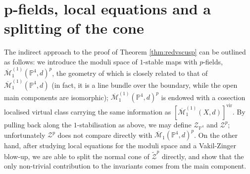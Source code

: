 \documentclass[11pt]{amsart}
\newcommand{\pazocal}{\mathcal}
\newcommand{\oM}{\overline{\mathcal{M}}}
\newcommand{\tZp}{\widetilde{\pazocal Z}^p}
\newcommand{\PP}{\mathbb P}
\newcommand{\virt}[1]{[#1]^{\mathrm{vir}}}
\theoremstyle{definition}
\theoremstyle{definition}
\begin{document}
\section{p-fields, local equations and a splitting of the cone}

The indirect approach to the proof of Theorem \ref{thm:redvscusp} can be outlined as follows: we introduce the moduli space of $1$-stable maps with $p$-fields, $\oM_1^{(1)}(\PP^4,d)^p$, the geometry of which is closely related to that of $\oM_1^{(1)}(\PP^4,d)$ (in fact, it is a line bundle over the boundary, while the open main components are isomorphic); $\oM_1^{(1)}(\PP^4,d)^p$ is endowed with a cosection localised virtual class carrying the same information as $\virt{\oM_1^{(1)}(X,d)}$. By pulling back along the $1$-stabilisation as above, we may define $\mathcal Z_{\PP^4}$ and $\mathcal Z^p$; unfortunately $\mathcal Z^p$ does not compare directly with $\oM_1(\PP^4,d)^p$. On the other hand, after studying local equations for the moduli space and a Vakil-Zinger blow-up, we are able to split the normal cone of $\tZp$ directly, and show that the only non-trivial contribution to the invariants comes from the main component.
\end{document}
